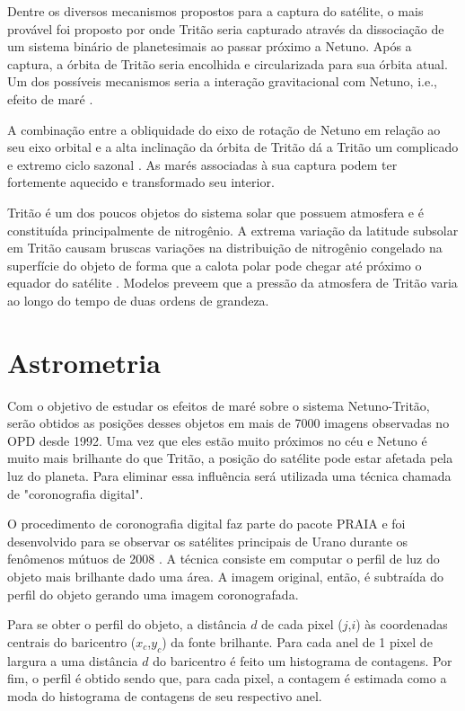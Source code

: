 \documentclass[12pt,a4paper]{monografia}
\begin{document}
Dentre os diversos mecanismos propostos para a captura do satélite, o mais provável foi proposto por \cite{Agnor2006} onde Tritão seria capturado através da dissociação de um sistema binário de planetesimais ao passar próximo a Netuno. Após a captura, a órbita de Tritão seria encolhida e circularizada para sua órbita atual. Um dos possíveis mecanismos seria a interação gravitacional com Netuno, i.e., efeito de maré \citep{Nogueira2011}.

A combinação entre a obliquidade do eixo de rotação de Netuno em relação ao seu eixo orbital e a alta inclinação da órbita de Tritão dá a Tritão um complicado e extremo ciclo sazonal \citep{McKinnon2007}. As marés associadas à sua captura podem ter fortemente aquecido e transformado seu interior.

Tritão é um dos poucos objetos do sistema solar que possuem atmosfera e é constituída principalmente de nitrogênio. A extrema variação da latitude subsolar em Tritão causam bruscas variações na distribuição de nitrogênio congelado na superfície do objeto de forma que a calota polar pode chegar até próximo o equador do satélite \citep{Hansen1992}. Modelos preveem que a pressão da atmosfera de Tritão varia ao longo do tempo de duas ordens de grandeza.



\section{Astrometria}
\label{Sec: Netuno-astrometria}

\indent \indent Com o objetivo de estudar os efeitos de maré sobre o sistema Netuno-Tritão, serão obtidos as posições desses objetos em mais de 7000 imagens observadas no OPD desde 1992. Uma vez que eles estão muito próximos no céu e Netuno é muito mais brilhante do que Tritão, a posição do satélite pode estar afetada pela luz do planeta. Para eliminar essa influência será utilizada uma técnica chamada de "coronografia digital".

O procedimento de coronografia digital faz parte do pacote PRAIA e foi desenvolvido para se observar os satélites principais de Urano durante os fenômenos mútuos de 2008 \citep{Assafin2008}. A técnica consiste em computar o perfil de luz do objeto mais brilhante dado uma área. A imagem original, então, é subtraída do perfil do objeto gerando uma imagem coronografada.

Para se obter o perfil do objeto, a distância $d$ de cada pixel ($j$,$i$) às coordenadas centrais do baricentro ($x_{c}$,$y_{c}$) da fonte brilhante. Para cada anel de 1 pixel de largura a uma distância $d$ do baricentro é feito um histograma de contagens. Por fim, o perfil é obtido sendo que, para cada pixel, a contagem é estimada como a moda do histograma de contagens de seu respectivo anel.
\end{document}
